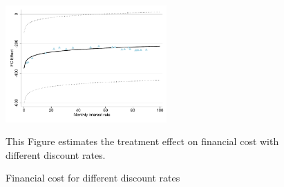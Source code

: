 \documentclass[oneside,11pt]{article}
\begin{document}
\begin{figure}[H]
        \caption{Financial cost for different discount rates}
    \label{fc_discount_rates}
    \begin{center}
        \centering
        \includegraphics[width=0.55\textwidth]{Figuras/discount_effect.pdf}
    \end{center}
     \scriptsize This Figure estimates the treatment effect on financial cost with different discount rates.  
\end{figure}
\end{document}
